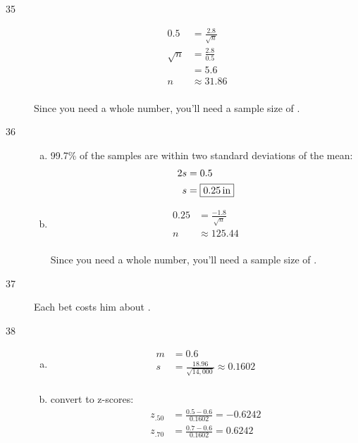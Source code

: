 \documentclass[letterpaper, landscape]{exam}
\newcommand{\cent}{\textcent\xspace}
\begin{document}
\begin{description}
      \item[35]
        \begin{align*}
          0.5      & = \frac{2.8}{\sqrt{n}} \\
          \sqrt{n} & = \frac{2.8}{0.5} \\
                   & = 5.6 \\
          n        & \approx 31.86 \\
        \end{align*}

        Since you need a whole number, you'll need a sample size of 
        .

      \item[36]
        \begin{enumerate}[(a)]
          \item 99.7\% of the samples are within two standard deviations of the
            mean:
            \begin{align*}
              2s & = 0.5 \\
              s  & = \boxed{ \unit[0.25]{in} } \\
            \end{align*}

          \item 
            \begin{align*}
              0.25 & = \frac{-1.8}{\sqrt{n}} \\
              n    & \approx 125.44 \\
            \end{align*}

            Since you need a whole number, you'll need a sample size of 
            .
        \end{enumerate}

      \item[37] Each bet costs him about \fbox{ 40\cent }.

      \item[38]
        \begin{enumerate}[(a)]
          \item 
            \begin{align*}
              m &= \boxed{ 0.6 } \\
              s &= \frac{18.96}{\sqrt{14,000}} \approx \boxed{ 0.1602 } \\
            \end{align*}
            
          \item
            convert to z-scores:
            \begin{align*}
              z_{.50} &= \frac{0.5 - 0.6}{0.1602} = -0.6242 \\
              z_{.70} &= \frac{0.7 - 0.6}{0.1602} = 0.6242 \\
            \end{align*}


\end{enumerate}
\end{description}
\end{document}

